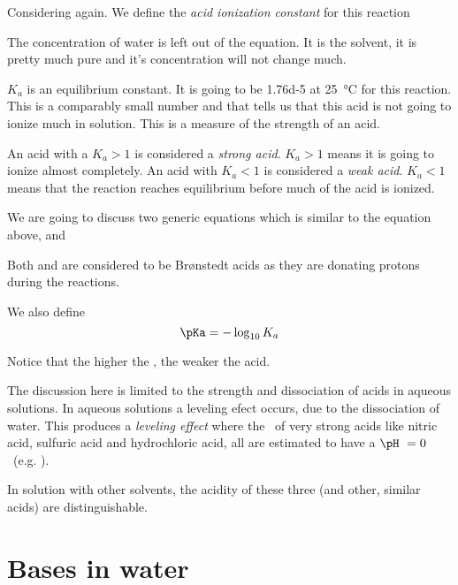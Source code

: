 \documentclass[../mit-general-chemistry.tex]{subfiles}
\begin{document}
Considering
again. We define the {\em acid ionization constant} for this reaction

The concentration of water is left out of the equation. It is the
solvent, it is pretty much pure and it's concentration will not change
much.

$K_a$ is an equilibrium constant. It is going to be \num{1.76d-5} at
\SI{25}{\celsius} for this reaction. This is a comparably small number
and that tells us that this acid is not going to ionize much in
solution. This is a measure of the strength of an acid.

An acid with a $K_a > 1$ is considered a {\em strong acid}. $K_a > 1$
means it is going to ionize almost completely. An acid with $K_a < 1$
is considered a {\em weak acid}. $K_a < 1$ means that the reaction
reaches equilibrium before much of the acid is ionized.

We are going to discuss two generic equations
which is similar to the equation above, and

Both  and  are considered to be Brønstedt acids as they
are donating protons during the reactions.

We also define
\begin{equation}
  \pKa = - \log_{10} K_a
\end{equation}

Notice that the higher the \pKa, the weaker the
acid.


\begin{remark}
  The discussion here is limited to the strength and dissociation of
  acids in aqueous solutions. In aqueous solutions a leveling efect
  occurs, due to the dissociation of water. This produces a {\em leveling
  effect} where the \pH\ of very strong acids like nitric acid,
  sulfuric acid and hydrochloric acid, all are estimated to have a
  $\pH\ = 0$~(e.g. \cite[172]{miessler2014}).

  In solution with other solvents, the acidity of these three (and
  other, similar acids) are distinguishable.
\end{remark}






\section{Bases in water}
\end{document}
